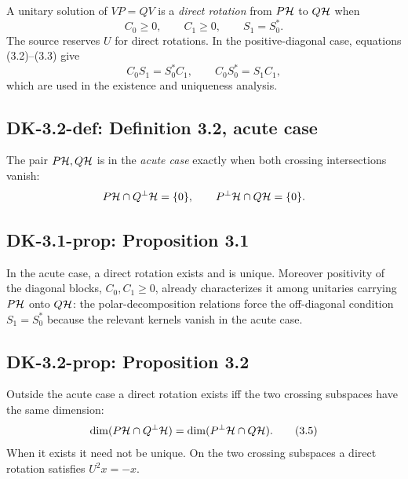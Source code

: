 A unitary solution of $VP=QV$ is a \emph{direct rotation} from $P\mathcal{H}$ to $Q\mathcal{H}$ when
\[
 C_0\ge0,\qquad C_1\ge0,\qquad S_1=S_0^*.
\]
The source reserves $U$ for direct rotations.  In the positive-diagonal case, equations (3.2)--(3.3) give
\begin{equation}
 C_0S_1=S_0^*C_1,
 \qquad
 C_0S_0^*=S_1C_1,
 \tag{3.4}
\end{equation}
which are used in the existence and uniqueness analysis.

\subsection*{DK-3.2-def: Definition 3.2, acute case}
The pair $P\mathcal{H},Q\mathcal{H}$ is in the \emph{acute case} exactly when both crossing intersections vanish:
\[
 P\mathcal{H}\cap Q^\perp\mathcal{H}=\{0\},
 \qquad
 P^\perp\mathcal{H}\cap Q\mathcal{H}=\{0\}.
\]

\subsection*{DK-3.1-prop: Proposition 3.1}
In the acute case, a direct rotation exists and is unique.  Moreover positivity of the diagonal blocks, $C_0,C_1\ge0$, already characterizes it among unitaries carrying $P\mathcal{H}$ onto $Q\mathcal{H}$: the polar-decomposition relations force the off-diagonal condition $S_1=S_0^*$ because the relevant kernels vanish in the acute case.

\subsection*{DK-3.2-prop: Proposition 3.2}
Outside the acute case a direct rotation exists iff the two crossing subspaces have the same dimension:
\begin{equation}
 \dim(P\mathcal{H}\cap Q^\perp\mathcal{H})
 =\dim(P^\perp\mathcal{H}\cap Q\mathcal{H}).
 \tag{3.5}
\end{equation}
When it exists it need not be unique.  On the two crossing subspaces a direct rotation satisfies $U^2x=-x$.

